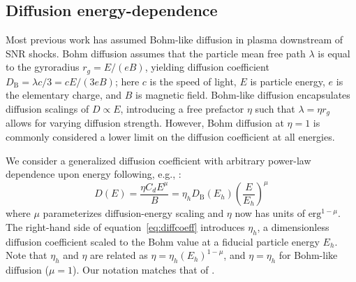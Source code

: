 \documentclass[iop, apj, numberedappendix]{emulateapj}
\newcommand*{\mt}{\mathrm}
\begin{document}
\subsection{Diffusion energy-dependence} \label{sec:diffcoeff}

Most previous work has assumed Bohm-like diffusion in plasma downstream of SNR
shocks.  Bohm diffusion assumes that the particle mean free path $\lambda$ is
equal to the gyroradius $r_g = E/(eB)$, yielding diffusion coefficient
$D_{\mt{B}} = \lambda c / 3 = c E / (3 e B)$; here $c$ is the speed of light,
$E$ is particle energy, $e$ is the elementary charge, and $B$ is magnetic
field.  Bohm-like diffusion encapsulates diffusion scalings of $D \propto E$,
introducing a free prefactor $\eta$ such that $\lambda = \eta r_g$ allows for
varying diffusion strength.  However, Bohm diffusion at $\eta = 1$ is commonly
considered a lower limit on the diffusion coefficient at all energies.


We consider a generalized diffusion coefficient with arbitrary
power-law dependence upon energy following, e.g., \citet{parizot2006}:
\begin{equation} \label{eq:diffcoeff}
    D(E) = \frac{\eta C_d E^\mu}{B}
         = \eta_h D_{\mt{B}}\left(E_h\right) \left(\frac{E}{E_h}\right)^\mu
\end{equation}
where $\mu$ parameterizes diffusion-energy scaling and $\eta$ now has units
of $\mt{erg}^{1-\mu}$.  The right-hand side of equation~\eqref{eq:diffcoeff}
introduces $\eta_h$, a dimensionless diffusion coefficient scaled to the Bohm
value at a fiducial particle energy $E_h$.  Note that $\eta_h$ and $\eta$ are
related as $\eta = \eta_h (E_h)^{1-\mu}$, and $\eta = \eta_h$ for Bohm-like
diffusion ($\mu = 1$).  Our notation matches that of .
\end{document}
